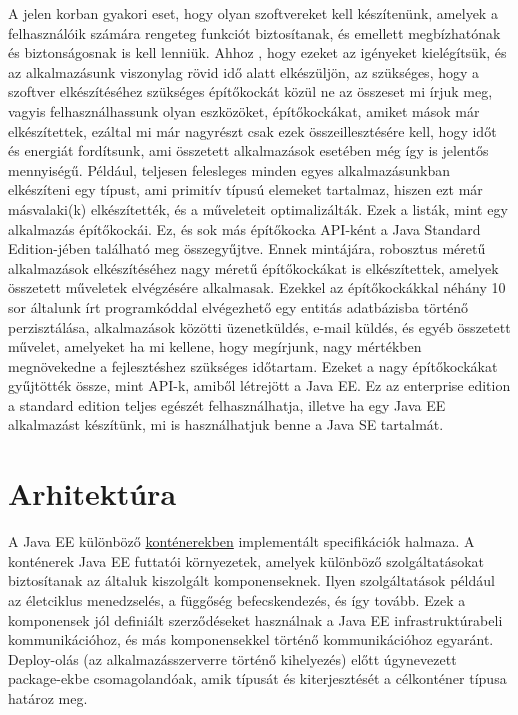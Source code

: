 \documentclass[centeredchapter]{thesis-ekf}
\theoremstyle{definition}
\theoremstyle{remark}
\begin{document}
A jelen korban gyakori eset, hogy olyan szoftvereket kell készítenünk, amelyek a felhasználóik számára rengeteg funkciót biztosítanak, és emellett megbízhatónak és biztonságosnak is kell lenniük. Ahhoz , hogy ezeket az igényeket kielégítsük, és az alkalmazásunk viszonylag rövid idő alatt elkészüljön, az szükséges, hogy a szoftver elkészítéséhez szükséges építőkockát közül ne az összeset mi írjuk meg, vagyis felhasználhassunk olyan eszközöket, építőkockákat, amiket mások már elkészítettek, ezáltal mi már nagyrészt csak ezek összeillesztésére kell, hogy időt és energiát fordítsunk, ami összetett alkalmazások esetében még így is jelentős mennyiségű. 
Például, teljesen felesleges minden egyes alkalmazásunkban elkészíteni egy típust, ami primitív típusú elemeket tartalmaz, hiszen ezt már másvalaki(k) elkészítették, és a műveleteit optimalizálták. Ezek a listák, mint egy alkalmazás építőkockái. Ez, és sok más építőkocka API-ként a Java Standard Edition-jében található meg összegyűjtve.
Ennek mintájára, robosztus méretű alkalmazások elkészítéséhez nagy méretű építőkockákat is elkészítettek, amelyek összetett műveletek elvégzésére alkalmasak. Ezekkel az építőkockákkal néhány 10 sor általunk írt programkóddal elvégezhető egy entitás adatbázisba történő perzisztálása, alkalmazások közötti üzenetküldés, e-mail küldés, és egyéb összetett művelet, amelyeket ha mi kellene, hogy megírjunk, nagy mértékben megnövekedne a fejlesztéshez szükséges időtartam.
Ezeket a nagy építőkockákat gyűjtötték össze, mint API-k, amiből létrejött a Java EE.
Ez az enterprise edition a standard edition teljes egészét felhasználhatja, illetve ha egy Java EE alkalmazást készítünk, mi is használhatjuk benne a Java SE tartalmát.

\section{Arhitektúra}

A Java EE különböző \hyperlink{figure-kontenerek}{konténerekben} implementált specifikációk halmaza. A konténerek Java EE futtatói környezetek, amelyek különböző szolgáltatásokat biztosítanak az általuk kiszolgált komponenseknek. Ilyen szolgáltatások például az életciklus menedzselés, a függőség befecskendezés, és így tovább. Ezek a komponensek jól definiált szerződéseket használnak a Java EE infrastruktúrabeli kommunikációhoz, és más komponensekkel történő kommunikációhoz egyaránt. Deploy-olás (az alkalmazásszerverre történő kihelyezés) előtt úgynevezett package-ekbe csomagolandóak, amik típusát és kiterjesztését a célkonténer típusa határoz meg.
\end{document}
